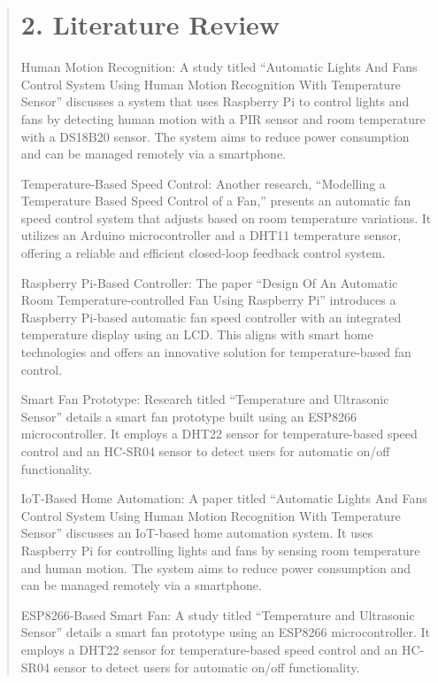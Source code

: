 \documentclass[12pt]{report}
\begin{document}
	\begin{quote}
		\section{2. Literature Review}
		Human Motion Recognition: A study titled “Automatic Lights And Fans Control System Using Human Motion Recognition With Temperature Sensor” discusses a system that uses Raspberry Pi to control lights and fans by detecting human motion with a PIR sensor and room temperature with a DS18B20 sensor. The system aims to reduce power consumption and can be managed remotely via a smartphone.
		
		Temperature-Based Speed Control: Another research, “Modelling a Temperature Based Speed Control of a Fan,” presents an automatic fan speed control system that adjusts based on room temperature variations. It utilizes an Arduino microcontroller and a DHT11 temperature sensor, offering a reliable and efficient closed-loop feedback control system.
		
		Raspberry Pi-Based Controller: The paper “Design Of An Automatic Room Temperature-controlled Fan Using Raspberry Pi” introduces a Raspberry Pi-based automatic fan speed controller with an integrated temperature display using an LCD. This aligns with smart home technologies and offers an innovative solution for temperature-based fan control.
		
		Smart Fan Prototype: Research titled “Temperature and Ultrasonic Sensor” details a smart fan prototype built using an ESP8266 microcontroller. It employs a DHT22 sensor for temperature-based speed control and an HC-SR04 sensor to detect users for automatic on/off functionality.
		
		IoT-Based Home Automation: A paper titled “Automatic Lights And Fans Control System Using Human Motion Recognition With Temperature Sensor” discusses an IoT-based home automation system. It uses Raspberry Pi for controlling lights and fans by sensing room temperature and human motion. The system aims to reduce power consumption and can be managed remotely via a smartphone.
		
		ESP8266-Based Smart Fan: A study titled “Temperature and Ultrasonic Sensor” details a smart fan prototype using an ESP8266 microcontroller. It employs a DHT22 sensor for temperature-based speed control and an HC-SR04 sensor to detect users for automatic on/off functionality.
		

\end{quote}
\end{document}
